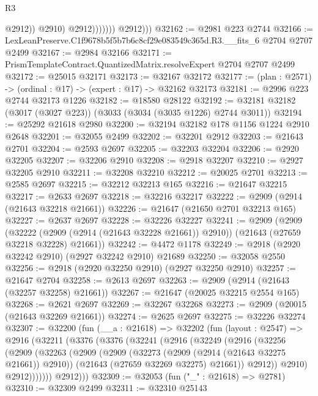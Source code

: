 \begin{lexlean}{R3}
\begin{coremodule}
                              @2912))
                          @2910)
                        @2912)))))))
          @2912)))
@32162 := @2981 @223 @2744
@32166 := LexLeanPreserve.C1f9678b5f5b7b6c8cf29e083549c365d.R3.__fits_6 @2704 @2707 @2499
@32167 := @2984 @32166
@32171 := PrismTemplateContract.QuantizedMatrix.resolveExpert @2704 @2707 @2499
@32172 := @25015 @32171
@32173 := @32167 @32172
@32177 := (plan : @2571) -> (ordinal : @17) -> (expert : @17) -> @32162 @32173
@32181 := @2996 @223 @2744 @32173 @1226
@32182 := @18580 @28122
@32192 := @32181 @32182 (@3017 (@3027 @223)) (@3033 (@3034 (@3035 @1226) @2744 @3011))
@32194 := @25292 @21618 @2980
@32200 := @32194 @32182 @178 @1156 @1224 @2910 @2648
@32201 := @32055 @2499
@32202 := @32201 @2912
@32203 := @21643 @2701
@32204 := @2593 @2697
@32205 := @32203 @32204
@32206 := @2920 @32205
@32207 := @32206 @2910
@32208 := @2918 @32207
@32210 := @2927 @32205 @2910
@32211 := @32208 @32210
@32212 := @20025 @2701
@32213 := @2585 @2697
@32215 := @32212 @32213 @165
@32216 := @21647 @32215
@32217 := @2633 @2697
@32218 := @32216 @32217
@32222 := @2909 (@2914 (@21643 @32218 @21661))
@32226 := @21647 (@21650 @2701 @32213 @165)
@32227 := @2637 @2697
@32228 := @32226 @32227
@32241 := @2909
    (@2909
      (@32222 (@2909 (@2914 (@21643 @32228 @21661)) @2910))
      (@21643 (@27659 @32218 @32228) @21661))
@32242 := @4472 @1178
@32249 := @2918 (@2920 @32242 @2910) (@2927 @32242 @2910) @21689
@32250 := @32058 @2550
@32256 := @2918 (@2920 @32250 @2910) (@2927 @32250 @2910)
@32257 := @21647 @2704
@32258 := @2613 @2697
@32263 := @2909 (@2914 (@21643 (@32257 @32258) @21661))
@32267 := @21647 (@20025 @32215 @2554 @165)
@32268 := @2621 @2697
@32269 := @32267 @32268
@32273 := @2909 (@20015 (@21643 @32269 @21661))
@32274 := @2625 @2697
@32275 := @32226 @32274
@32307 := @32200
    (fun (__a : @21618) =>
    @32202
      (fun (layout : @2547) =>
      @2916
        (@32211
          (@3376
            (@3376
              (@32241
                (@2916
                  (@32249
                    (@2916
                      (@32256
                        (@2909
                          (@32263
                            (@2909
                              (@2909
                                (@32273 (@2909 (@2914 (@21643 @32275 @21661)) @2910))
                                (@21643 (@27659 @32269 @32275) @21661))
                              @2912))
                          @2910)
                        @2912)))))))
          @2912)))
@32309 := @32053 (fun ("_" : @21618) => @2781)
@32310 := @32309 @2499
@32311 := @32310 @25143

\end{coremodule}
\end{lexlean}
